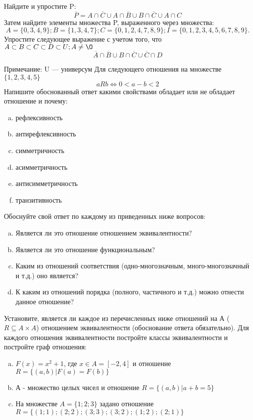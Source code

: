 \documentclass[10pt]{exam}
\begin{document}
\begin{questions}
\question
Найдите и упростите P:
\begin{equation*}
\overline{P} = A \cap \overline{C} \cup A \cap \overline{B} \cup B \cap \overline{C} \cup A \cap C
\end{equation*}
Затем найдите элементы множества P, выраженного через множества:
\begin{equation*}
A = \{0, 3, 4, 9\}; 
B = \{1, 3, 4, 7\};
C = \{0, 1, 2, 4, 7, 8, 9\};
I = \{0, 1, 2, 3, 4, 5, 6, 7, 8, 9\}.
\end{equation*}\question
Упростите следующее выражение с учетом того, что $A\subset B \subset C \subset D \subset U; A \neq \O$
\begin{equation*}
\overline{A} \cap \overline{B} \cup B \cap \overline{C} \cup \overline{C} \cap D
\end{equation*}

Примечание: U — универсум\question
Для следующего отношения на множестве $\{1, 2, 3, 4, 5\}$ 
\begin{equation*}
aRb \iff 0 < a-b<2
\end{equation*}
Напишите обоснованный ответ какими свойствами обладает или не обладает отношение и почему:   
\begin{enumerate} [a)]\setcounter{enumi}{0}
\item рефлексивность
\item антирефлексивность
\item симметричность
\item асимметричность
\item антисимметричность
\item транзитивность
\end{enumerate}

Обоснуйте свой ответ по каждому из приведенных ниже вопросов:
\begin{enumerate} [a)]\setcounter{enumi}{0}
    \item Является ли это отношение отношением эквивалентности?
    \item Является ли это отношение функциональным?
    \item Каким из отношений соответствия (одно-многозначным, много-многозначный и т.д.) оно является?
    \item К каким из отношений порядка (полного, частичного и т.д.) можно отнести данное отношение?
\end{enumerate}
\question
Установите, является ли каждое из перечисленных ниже отношений на А ($R \subseteq A \times A$) отношением эквивалентности (обоснование ответа обязательно). Для каждого отношения эквивалентности постройте классы эквивалентности и постройте граф отношения:
\begin{enumerate} [a)]\setcounter{enumi}{0}
\item $F(x)=x^{2}+1$, где $x \in A = [-2, 4]$ и отношение $R = \{(a,b)|F(a) = F(b)\}$
\item А - множество целых чисел и отношение $R = \{(a,b)|a + b = 5\}$
\item На множестве $A = \{1; 2; 3\}$ задано отношение $R = \{(1; 1); (2; 2); (3; 3); (3; 2); (1; 2); (2; 1)\}$


\end{enumerate}
\end{questions}
\end{document}

